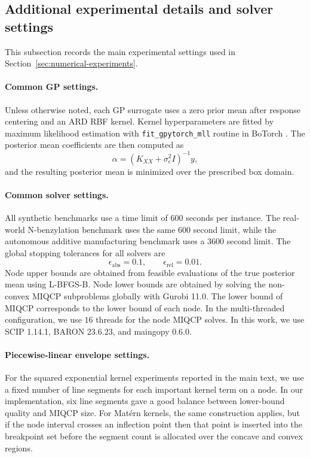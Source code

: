 \documentclass[pdflatex,sn-mathphys-num]{sn-jnl}%
\theoremstyle{thmstyleone}%
\theoremstyle{thmstyletwo}%
\theoremstyle{thmstylethree}%
\begin{document}
\subsection{Additional experimental details and solver settings}
\label{app:exp_details}

This subsection records the main experimental settings used in Section~\ref{sec:numerical-experiments}.

\paragraph{Common GP settings.}
Unless otherwise noted, each GP surrogate uses a zero prior mean after response centering and an ARD RBF kernel. Kernel hyperparameters are fitted by maximum likelihood estimation with \texttt{fit\_gpytorch\_mll} routine in BoTorch \cite{balandat2020botorch}. The posterior mean coefficients are then computed as
\[
\alpha=(K_{XX}+\sigma_\epsilon^2 I)^{-1}y,
\]
and the resulting posterior mean is minimized over the prescribed box domain.

\paragraph{Common solver settings.}
All synthetic benchmarks use a time limit of $600$ seconds per instance. The real-world N-benzylation benchmark uses the same $600$ second limit, while the autonomous additive manufacturing benchmark uses a $3600$ second limit. The global stopping tolerances for all solvers are
\[
\epsilon_{\mathrm{abs}}=0.1,
\qquad
\epsilon_{\mathrm{rel}}=0.01.
\]
Node upper bounds are obtained from feasible evaluations of the true posterior mean using L-BFGS-B. Node lower bounds are obtained by solving the non-convex MIQCP subproblems globally with Gurobi 11.0\cite{gurobi}. The lower bound of MIQCP corresponds to the lower bound of each node. In the multi-threaded configuration, we use $16$ threads for the node MIQCP solves. In this work, we use SCIP 1.14.1, BARON 23.6.23, and maingopy 0.6.0. 

\paragraph{Piecewise-linear envelope settings.}
For the squared exponential kernel experiments reported in the main text, we use a fixed number of line segments for each important kernel term on a node. In our implementation, six line segments gave a good balance between lower-bound quality and MIQCP size. For Mat\'ern kernels, the same construction applies, but if the node interval crosses an inflection point then that point is inserted into the breakpoint set before the segment count is allocated over the concave and convex regions.
\end{document}
